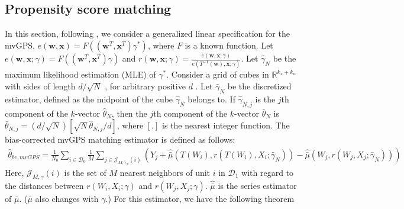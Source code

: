 \documentclass[11pt]{article}
\numberwithin{equation}{section}
\theoremstyle{definition}
\begin{document}
\subsection{Propensity score matching}
In this section, following \cite{abadie2016matching}, we consider a generalized linear specification for the mvGPS, $e(\mathbf{w},\mathbf{x})=F\left((\mathbf{w}^{T},\mathbf{x}^{T})\gamma^*\right)$, where $F$ is a known function. Let $e(\mathbf{w},\mathbf{x};\gamma)=F\left((\mathbf{w}^{T},\mathbf{x}^{T})\gamma\right)$ and $r(\mathbf{w},\mathbf{x};\gamma)=\frac{e(\mathbf{w},\mathbf{x};\gamma)}{e(T^{-1}(\mathbf{w}),\mathbf{x};\gamma)}$. Let $\widehat{\gamma}_N$ be the maximum likelihood estimation (MLE) of $\gamma^*$. Consider a grid of cubes in  $\mathbb{R}^{k_x+k_w}$  with sides of length  $ d/ \sqrt{N}$ , for arbitrary positive  $d$ . Let  $\bar{\gamma}_{N}$  be the discretized estimator, defined as the midpoint of the cube  $\widehat{\gamma}_{N}$  belongs to. If  $\widehat{\gamma}_{N, j}$  is the  $j$th component of the  $k$-vector  $\widehat{\theta}_{N}$, then the  $j$th component of the  $k$-vector $\bar{\theta}_{N}$  is  $\bar{\theta}_{N, j}=(d / \sqrt{N})\left[\sqrt{N} \widehat{\theta}_{N, j} / d\right]$, where $[.]$ is the nearest integer function. The bias-corrected mvGPS matching estimator is defined as follows:
\begin{align}
\widehat{\theta}_{bc,mvGPS}=\frac{1}{N_0}\sum_{i \in \mathcal{D}_0}\frac{1}{M}\sum_{j\in\mathcal{J}_{M,\bar{\gamma}_N}(i)}(Y_{j}+\widehat{\bar{\mu}}(T(W_i),r(T(W_i),X_i;\bar{\gamma}_N))-\widehat{\bar{\mu}}(W_{j},r(W_{j},X_{j};\bar{\gamma}_N)))
\end{align}
Here, $\mathcal{J}_{M,\gamma}(i)$ is the set of $M$ nearest neighbors of unit $i$ in $\mathcal{D}_1$ with regard to the distances between $r(W_i,X_i;\gamma)$ and $r(W_j,X_j;\gamma)$. $\widehat{\bar{\mu}}$ is the series estimator of $\bar{\mu}$. ($\bar{\mu}$ also changes with $\gamma$.) For this estimator, we have the following theorem
\end{document}
